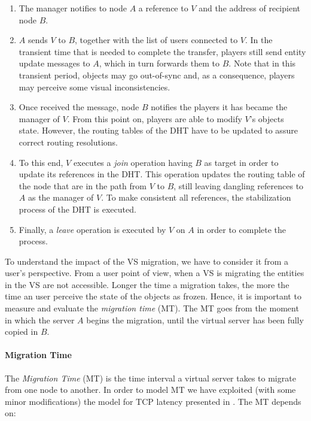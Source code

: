 \documentclass[final,10pt,a5paper]{phdimt}
\theoremstyle{definition}
\begin{document}
\begin{enumerate}
\item The manager notifies to node $A$ a reference to $V$ and the address of recipient node $B$.
\item $A$ sends $V$ to $B$, together with the list of users connected to $V$. 
In the transient time that is needed to complete the transfer, players still send entity update messages to $A$, 
which in turn forwards them to $B$. Note that in this transient period, objects may go 
out-of-sync and, as a consequence, players may perceive some visual inconsistencies.

\item Once received the message, node $B$ notifies the players it has became the manager of $V$.
From this point on, players are able to modify $V$'s objects state.  However, the routing tables of the DHT have to be updated to assure correct routing resolutions.


\item To this end, $V$ executes a \textit{join} operation having $B$ as target in order to update its references in the DHT.
This operation updates the routing table of the node that are in the path from $V$ to $B$, still leaving dangling references to $A$ as the manager of $V$.  To make consistent all references, the stabilization process of the DHT is executed.
\item Finally, a \textit{leave} operation is executed by $V$ on $A$ in order to complete the process.
\end{enumerate}


To understand the impact of the VS migration, we have to consider it from a user's perspective.
From a user point of view, when a VS is migrating the entities in the VS are not accessible.
Longer the time a migration takes, the more the time an user perceive the state of the objects as frozen.
Hence, it is important to measure and evaluate the \textit{migration time} (MT).
The MT goes from the moment in which the server $A$ begins the migration, until the virtual server has been fully copied in $B$.




\paragraph{Migration Time}

The \textit{Migration Time} (MT) is the time interval a virtual server takes to migrate from one node to another.
In order to model MT we have exploited (with some minor modifications) the model for TCP latency presented in \cite{cardwell2000modeling}. The MT depends on:
\end{document}
